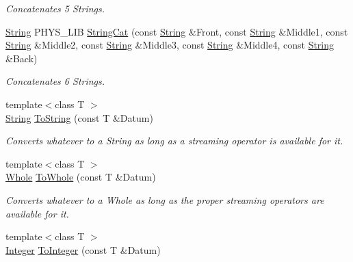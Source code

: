 \begin{DoxyCompactItemize}
\begin{DoxyCompactList}\small\item\em Concatenates 5 Strings. \item\end{DoxyCompactList}\item 
\hyperlink{namespacephys_aa03900411993de7fbfec4789bc1d392e}{String} PHYS\_\-LIB \hyperlink{namespacephys_abf6b30d4f424f33ee4c74d1cb6eca109}{StringCat} (const \hyperlink{namespacephys_aa03900411993de7fbfec4789bc1d392e}{String} \&Front, const \hyperlink{namespacephys_aa03900411993de7fbfec4789bc1d392e}{String} \&Middle1, const \hyperlink{namespacephys_aa03900411993de7fbfec4789bc1d392e}{String} \&Middle2, const \hyperlink{namespacephys_aa03900411993de7fbfec4789bc1d392e}{String} \&Middle3, const \hyperlink{namespacephys_aa03900411993de7fbfec4789bc1d392e}{String} \&Middle4, const \hyperlink{namespacephys_aa03900411993de7fbfec4789bc1d392e}{String} \&Back)
\begin{DoxyCompactList}\small\item\em Concatenates 6 Strings. \item\end{DoxyCompactList}\item 
{\footnotesize template$<$class T $>$ }\\\hyperlink{namespacephys_aa03900411993de7fbfec4789bc1d392e}{String} \hyperlink{namespacephys_ae81e34843c6c569026b9a7d9d54c4f04}{ToString} (const T \&Datum)
\begin{DoxyCompactList}\small\item\em Converts whatever to a String as long as a streaming operator is available for it. \item\end{DoxyCompactList}\item 
{\footnotesize template$<$class T $>$ }\\\hyperlink{namespacephys_a460f6bc24c8dd347b05e0366ae34f34a}{Whole} \hyperlink{namespacephys_a53d44a46cab542ef86a541af5f1a7b62}{ToWhole} (const T \&Datum)
\begin{DoxyCompactList}\small\item\em Converts whatever to a Whole as long as the proper streaming operators are available for it. \item\end{DoxyCompactList}\item 
{\footnotesize template$<$class T $>$ }\\\hyperlink{namespacephys_a7f09bf5585b2bb97613cd9aad4273a81}{Integer} \hyperlink{namespacephys_a7fe8a4cf645e000483652f26ef8d6e47}{ToInteger} (const T \&Datum)

\end{DoxyCompactItemize}
